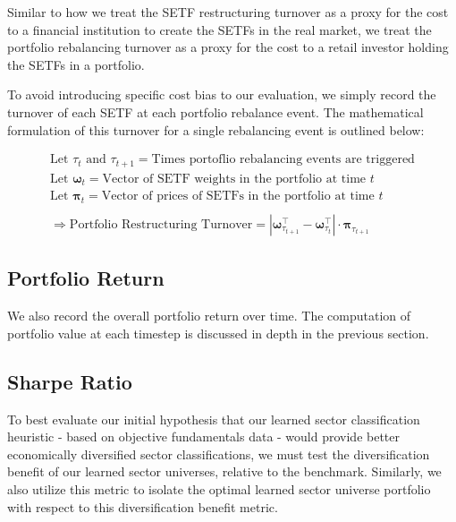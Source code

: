 \documentclass[../main.tex]{subfiles}
\begin{document}
Similar to how we treat the SETF restructuring turnover as a proxy for the cost to a financial institution to create the SETFs in the real market, we treat the portfolio rebalancing turnover as a proxy for the cost to a retail investor holding the SETFs in a portfolio.

To avoid introducing specific cost bias to our evaluation, we simply record the turnover of each SETF at each portfolio rebalance event. The mathematical formulation of this turnover for a single rebalancing event is outlined below:

\begin{gather*}
    \text{Let $\tau_t$ and $\tau_{t+1}$} = \text{Times portoflio rebalancing events are triggered} \\
    \text{Let $\boldsymbol{\omega}_t$} = \text{Vector of SETF weights in the portfolio at time $t$} \\
    \text{Let $\boldsymbol{\pi}_t$} = \text{Vector of prices of SETFs in the portfolio at time $t$} \\
    \\
    \Rightarrow \text{Portfolio Restructuring Turnover} = \left| \boldsymbol{\omega}_{\tau_{t + 1}}^\intercal - \boldsymbol{\omega}_{\tau_t}^\intercal \right| \cdot \boldsymbol{\pi}_{\tau_{t+1}}
\end{gather*}

\pagebreak

\subsection{Portfolio Return}

We also record the overall portfolio return over time. The computation of portfolio value at each timestep is discussed in depth in the previous section.

\subsection{Sharpe Ratio}

To best evaluate our initial hypothesis that our learned sector classification heuristic - based on objective fundamentals data - would provide better economically diversified sector classifications, we must test the diversification benefit of our learned sector universes, relative to the benchmark. Similarly, we also utilize this metric to isolate the optimal learned sector universe portfolio with respect to this diversification benefit metric.
\end{document}
